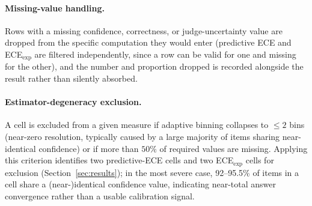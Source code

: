 \documentclass[letterpaper]{article} %
\begin{document}
\paragraph{Missing-value handling.} Rows with a missing confidence, correctness, or judge-uncertainty value are dropped from the specific computation they would enter (predictive ECE and ECE$_{\text{exp}}$ are filtered independently, since a row can be valid for one and missing for the other), and the number and proportion dropped is recorded alongside the result rather than silently absorbed. 

\paragraph{Estimator-degeneracy exclusion.} A cell is excluded from a given measure if adaptive binning collapses to $\leq 2$ bins (near-zero resolution, typically caused by a large majority of items sharing near-identical confidence) or if more than $50\%$ of required values are missing. Applying this criterion identifies two predictive-ECE cells and two ECE$_{\text{exp}}$ cells for exclusion (Section~\ref{sec:results}); in the most severe case, 92--95.5\% of items in a cell share a (near-)identical confidence value, indicating near-total answer convergence rather than a usable calibration signal.
\end{document}
